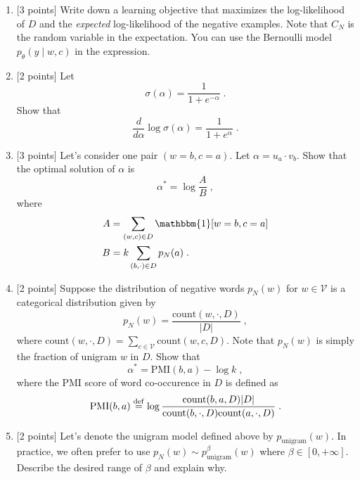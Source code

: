 \documentclass{article}
\theoremstyle{case}
\newcommand\eqdef{\stackrel{\rm def}{=}} %
\theoremstyle{definition}
\newcommand{\hint}[1]{\noindent{[\textbf{HINT:} #1]}}
\begin{document}
\begin{enumerate}
    \item {[3 points]} Write down a learning objective that maximizes the log-likelihood of $D$
        and the \emph{expected} log-likelihood of the negative examples.
        Note that $C_N$ is the random variable in the expectation.
        You can use the Bernoulli model $p_\theta(y\mid w, c)$ in the expression.


    \newpage
\item {[2 points]} Let 
        $$
        \sigma(\alpha) = \frac{1}{1+e^{-\alpha}} \;.
        $$
        Show that
        $$
        \frac{d}{d\alpha}\log \sigma(\alpha) = \frac{1}{1+e^\alpha} \;.
        $$

    
    \newpage
\item {[3 points]} Let's consider one pair $(w=b,c=a)$.
        Let $\alpha = u_a\cdot v_b$.  
        Show that the optimal solution of $\alpha$ is
        $$
        \alpha^\ast = \log \frac{A}{B} \;,
        $$
        where
        \begin{align} 
            A &= \sum_{(w,c)\in D}\mathbbm{1}[w=b,c=a] \\
            B &= k\sum_{(b,\cdot)\in D}p_N(a) \;.
        \end{align} 
        \hint{
            Let $\ell(\theta)$ be the objective.
            Solve for $\alpha$ in $\frac{\partial \ell}{\partial \alpha}=0$.
            You can use results from previous questions.
        }
    \newpage
\item {[2 points]} Suppose the distribution of negative words $p_N(w)$ for $w\in\mathcal{V}$ is a categorical distribution given by
        $$
        p_N(w) = \frac{\text{count}(w, \cdot, D)}{|D|} \;,
        $$
        where $\text{count}(w, \cdot, D)  = \sum_{c\in\mathcal{V}} \text{count}(w, c, D)$.
        Note that $p_N(w)$ is simply the fraction of unigram $w$ in $D$. 
        Show that
        $$
        \alpha^\ast = \text{PMI}(b,a) - \log k  \;,
        $$
        where the PMI score of word co-occurence in $D$ is defined as
        $$
        \text{PMI}(b,a) \eqdef \log
        \frac{\text{count}(b,a,D)|D|}
        {\text{count}(b,\cdot, D) \text{count}(a,\cdot, D)}
        \;.
        $$
    \newpage
\item {[2 points]} Let's denote the unigram model defined above by $p_{\text{unigram}}(w)$.
        In practice, we often prefer to use $p_N(w) \sim p_{\text{unigram}}^\beta(w)$
        where $\beta\in [0, +\infty]$.
        Describe the desired range of $\beta$ and explain why. 

\end{enumerate}
\end{document}
